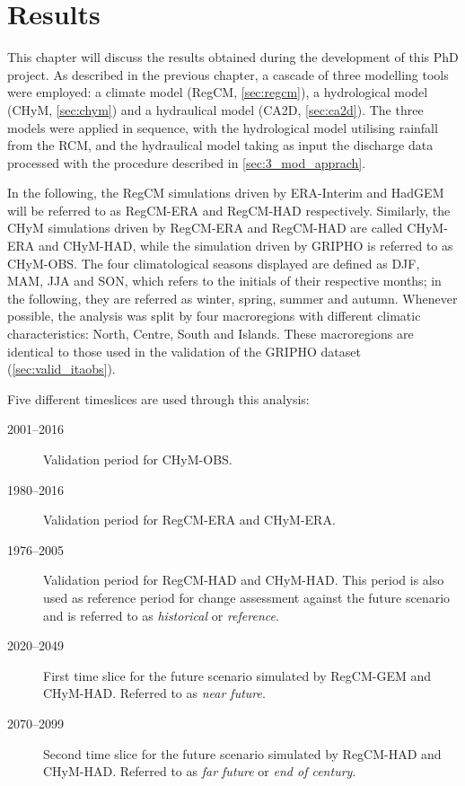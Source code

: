 \chapter{Results}\label{chp:results}
This chapter will discuss the results obtained during the development of this PhD project.
As described in the previous chapter, a cascade of three modelling tools were employed: a climate model (RegCM, \cref{sec:regcm}), a hydrological model (CHyM, \cref{sec:chym}) and a hydraulical model (CA2D, \cref{sec:ca2d}).
The three models were applied in sequence, with the hydrological model utilising rainfall from the RCM, and the hydraulical model taking as input the discharge data processed with the procedure described in \cref{sec:3_mod_apprach}.

In the following, the RegCM simulations driven by ERA-Interim and HadGEM will be referred to as RegCM-ERA and RegCM-HAD respectively.
Similarly, the CHyM simulations driven by RegCM-ERA and RegCM-HAD are called CHyM-ERA and CHyM-HAD, while the simulation driven by GRIPHO is referred to as CHyM-OBS.
The four climatological seasons displayed are defined as DJF, MAM, JJA and SON, which refers to the initials of their respective months; in the following, they are referred as winter, spring, summer and autumn.
Whenever possible, the analysis was split by four macroregions with different climatic characteristics: North, Centre, South and Islands. These macroregions are identical to those used in the validation of the GRIPHO dataset (\cref{sec:valid_itaobs}).

Five different timeslices are used through this analysis:
\begin{description}
    \item[2001--2016] Validation period for CHyM-OBS.
    \item[1980--2016] Validation period for RegCM-ERA and CHyM-ERA.
    \item[1976--2005] Validation period for RegCM-HAD and CHyM-HAD. This period is also used as reference period for change assessment against the future scenario and is referred to as \emph{historical} or \emph{reference}.
    \item[2020--2049] First time slice for the future scenario simulated by RegCM-GEM and CHyM-HAD. Referred to as \emph{near future}.
    \item[2070--2099] Second time slice for the future scenario simulated by RegCM-HAD and CHyM-HAD. Referred to as \emph{far future} or \emph{end of century}.
\end{description}

